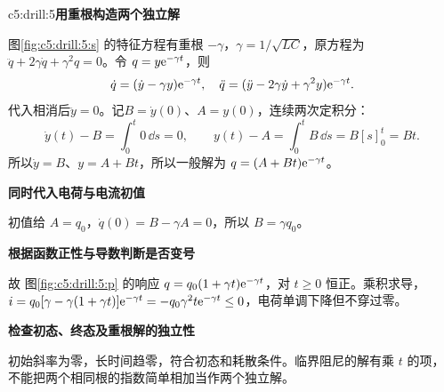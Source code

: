 \begin{drillsolution}{c5:drill:5}\textbf{用重根构造两个独立解}\par\nobreak
图\ref{fig:c5:drill:5:s} 的特征方程有重根 $-\gamma$，$\gamma=1/\sqrt{LC}$，原方程为 $\ddot q+2\gamma\dot q+\gamma^2q=0$。令 $q=y\mathrm e^{-\gamma t}$，则
\[
\dot q=(\dot y-\gamma y)\mathrm e^{-\gamma t},\quad
\ddot q=(\ddot y-2\gamma\dot y+\gamma^2y)\mathrm e^{-\gamma t}.
\]
代入相消后$\ddot y=0$。记$B=\dot y(0)$、$A=y(0)$，连续两次定积分：
\[
\dot y(t)-B=\int_0^t0\,\dd s=0,\qquad
y(t)-A=\int_0^tB\,\dd s=B[s]_0^t=Bt.
\]
所以$\dot y=B$、$y=A+Bt$，所以一般解为 $q=(A+Bt)\mathrm e^{-\gamma t}$。

\par\medskip{}\noindent\textbf{同时代入电荷与电流初值}\par\nobreak
初值给 $A=q_0$，$\dot q(0)=B-\gamma A=0$，所以 $B=\gamma q_0$。



\par\medskip{}\noindent\textbf{根据函数正性与导数判断是否变号}\par\nobreak
故 图\ref{fig:c5:drill:5:p} 的响应 $q=q_0(1+\gamma t)\mathrm e^{-\gamma t}$，对 $t\ge0$ 恒正。乘积求导，
$i=q_0[\gamma-\gamma(1+\gamma t)]\mathrm e^{-\gamma t}
=-q_0\gamma^2t\mathrm e^{-\gamma t}\le0$，电荷单调下降但不穿过零。

\par\medskip{}\noindent\textbf{检查初态、终态及重根解的独立性}\par\nobreak
初始斜率为零，长时间趋零，符合初态和耗散条件。临界阻尼的解有乘 $t$ 的项，不能把两个相同根的指数简单相加当作两个独立解。\end{drillsolution}
